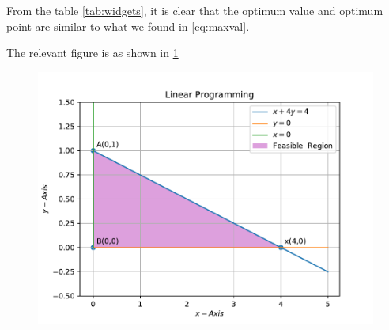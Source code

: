 \documentclass[12pt]{article}
\begin{document}
\begin{enumerate}
\begin{enumerate}
From the table \ref{tab:widgets}, it is clear that the optimum value and optimum point are similar to what we found in \eqref{eq:maxval}. 
\end{enumerate}
The relevant figure is as shown in \ref{fig:inequality}
\begin{figure}[!h]
	\begin{center}
		\includegraphics[width=\columnwidth]{figs/problem1.pdf}
	\end{center}
	\caption{}
	\label{fig:inequality}
\end{figure}
\end{enumerate}
\end{document}
